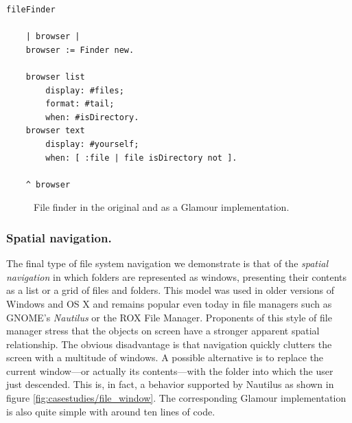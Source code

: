 \documentclass[a4paper,10pt,twoside]{book}
\begin{document}
\begin{lstlisting}
fileFinder

	| browser |
	browser := Finder new.
	
	browser list
		display: #files;
		format: #tail;
		when: #isDirectory.
	browser text
		display: #yourself;
		when: [ :file | file isDirectory not ].

	^ browser
\end{lstlisting}

\begin{figure}[tbp]
\begin{center}
\caption{File finder in the original and as a Glamour implementation.}
\label{fig:casestudies/file_finder}
\end{center}
\end{figure}

\subsubsection{Spatial navigation.} The final type of file system navigation we demonstrate is that of the \emph{spatial navigation} in which folders are represented as windows, presenting their contents as a list or a grid of files and folders. This model was used in older versions of Windows and OS X and remains popular even today in file managers such as GNOME's \emph{Nautilus} or the ROX File Manager. Proponents of this style of file manager stress that the objects on screen have a stronger apparent spatial relationship. The obvious disadvantage is that navigation quickly clutters the screen with a multitude of windows. A possible alternative is to replace the current window---or actually its contents---with the folder into which the user just descended. This is, in fact, a behavior supported by Nautilus as shown in figure \ref{fig:casestudies/file_window}. The corresponding Glamour implementation is also quite simple with around ten lines of code.
\end{document}
